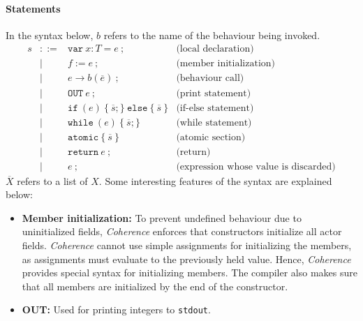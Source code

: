 \documentclass[a4paper,12pt,fleqn]{article}
\begin{document}
\paragraph{Statements\\}
In the syntax below, $b$ refers to the name of the behaviour being invoked.
\[
\begin{array}{lcll}
s & ::= & \mathtt{var}\ x : T = e\ ; & \text{(local declaration)} \\
  & \mid & f := e\ ; & \text{(member initialization)} \\
  & \mid & e \to b(\overline{e})\ ; & \text{(behaviour call)} \\
  & \mid & \mathtt{OUT}\ e\ ; & \text{(print statement)} \\
  & \mid & \mathtt{if}\ (e)\ \{\ \overline{s}; \}\ \mathtt{else}\ \{\ \overline{s}\ \} & \text{(if-else statement)} \\
  & \mid & \mathtt{while}\ (e)\ \{\ \overline{s}; \} & \text{(while statement)} \\
  & \mid & \mathtt{atomic}\ \{\ \overline{s}\ \} & \text{(atomic section)}\\
  & \mid & \mathtt{return}\ e\ ; & \text{(return)}\\
  & \mid & e\ ; & \text{(expression whose value is discarded)}
\end{array}
\]
$\overline{X}$ refers to a list of $X$. Some interesting features of the syntax are explained below:
\begin{itemize}
    \item \textbf{Member initialization:} To prevent undefined behaviour due to uninitialized fields, \textit{Coherence} enforces that constructors initialize all actor fields. \textit{Coherence} cannot use simple assignments for initializing the members, as assignments must evaluate to the previously held value. Hence, \textit{Coherence} provides special syntax for initializing members. The compiler also makes sure that all members are initialized by the end of the constructor.
    \item \textbf{OUT:} Used for printing integers to \texttt{stdout}.
\end{itemize}
\end{document}
